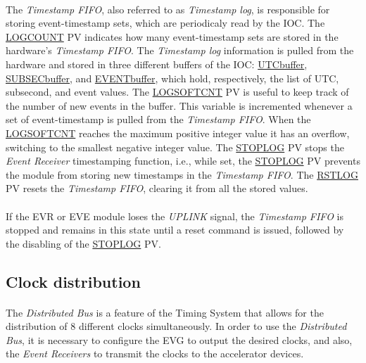 \documentclass[openany]{article}
\begin{document}
		\paragraph{} The \emph{Timestamp FIFO}, also referred to as \emph{Timestamp log}, is responsible for storing event-timestamp sets, which are periodicaly read by the IOC. The \hyperref[pvgroup:evre-timestamp-log]{LOGCOUNT} PV indicates how many event-timestamp sets are stored in the hardware's \emph{Timestamp FIFO}. The \emph{Timestamp log} information is pulled from the hardware and stored in three different buffers of the IOC: \hyperref[pvgroup:evre-timestamp-log]{UTCbuffer}, \hyperref[pvgroup:evre-timestamp-log]{SUBSECbuffer}, and \hyperref[pvgroup:evre-timestamp-log]{EVENTbuffer}, which hold, respectively, the list of UTC, subsecond, and event values. The \hyperref[pvgroup:evre-timestamp-log]{LOGSOFTCNT} PV is useful to keep track of the number of new events in the buffer. This variable is incremented whenever a set of event-timestamp is pulled from the \emph{Timestamp FIFO}. When the \hyperref[pvgroup:evre-timestamp-log]{LOGSOFTCNT} reaches the maximum positive integer value it has an overflow, switching to the smallest negative integer value. The \hyperref[pvgroup:evre-timestamp-log]{STOPLOG} PV stops the \emph{Event Receiver} timestamping function, i.e., while set, the \hyperref[pvgroup:evre-timestamp-log]{STOPLOG} PV prevents the module from storing new timestamps in the \emph{Timestamp FIFO}. The \hyperref[pvgroup:evre-timestamp-log]{RSTLOG} PV resets the \emph{Timestamp FIFO}, clearing it from all the stored values.
		\paragraph{} If the EVR or EVE module loses the \emph{UPLINK} signal, the \emph{Timestamp FIFO} is stopped and remains in this state until a reset command is issued, followed by the disabling of the \hyperref[pvgroup:evre-timestamp-log]{STOPLOG} PV.

	\subsection{Clock distribution}
		\paragraph{} The \emph{Distributed Bus} is a feature of the Timing System that allows for the distribution of 8 different clocks simultaneously. In order to use the \emph{Distributed Bus}, it is necessary to configure the EVG to output the desired clocks, and also, the \emph{Event Receivers} to transmit the clocks to the accelerator devices.
\end{document}
